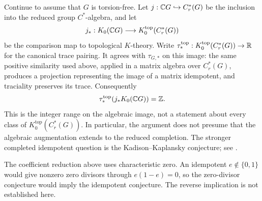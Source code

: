 \begin{remark}
Continue to assume that $G$ is torsion-free. Let
$j:\mathbb C G\hookrightarrow C_r^*(G)$ be the inclusion into the reduced
group $C^*$-algebra, and let
\[
 j_*:K_0(\mathbb C G)\longrightarrow K_0^{\mathrm{top}}(C_r^*(G))
\]
be the comparison map to topological $K$-theory. Write
$\tau_*^{\mathrm{top}}:K_0^{\mathrm{top}}(C_r^*(G))\to\mathbb R$ for the
canonical trace pairing. It agrees with $\tau_{G,*}$ on this image:
the same positive similarity used above, applied in a matrix algebra
over $C_r^*(G)$, produces a projection representing the image of a
matrix idempotent, and traciality preserves its trace. Consequently
\[
 \tau_*^{\mathrm{top}}\!\left(j_*K_0(\mathbb C G)\right)=\mathbb Z.
\]
This is the integer range on the algebraic image, not a statement
about every class of $K_0^{\mathrm{top}}(C_r^*(G))$. In particular,
the argument does not presume that the algebraic augmentation extends
to the reduced completion. The stronger completed idempotent question
is the Kadison--Kaplansky conjecture; see \cite[Section 1]{OW2023}.

The coefficient reduction above uses characteristic zero. An idempotent
$e\notin\{0,1\}$ would give nonzero zero divisors through $e(1-e)=0$,
so the zero-divisor conjecture would imply the idempotent conjecture.
The reverse implication is not established here.
\end{remark}
